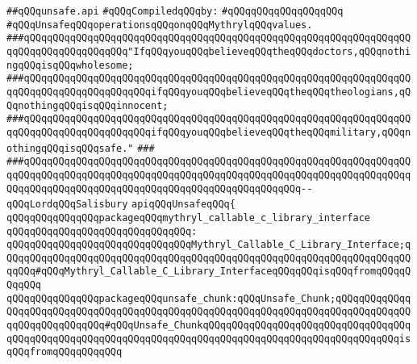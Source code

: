 \label{src/lib/std/src/unsafe/unsafe.api}
\verb|##qQQqunsafe.api|\newline
\newline
\verb|#qQQqCompiledqQQqby:|\newline
\verb|#qQQqqQQqqQQqqQQqqQQq|\newline
\newline
\newline
\newline
\verb|#qQQqUnsafeqQQqoperationsqQQqonqQQqMythrylqQQqvalues.|\newline
\newline
\newline
\verb|###qQQqqQQqqQQqqQQqqQQqqQQqqQQqqQQqqQQqqQQqqQQqqQQqqQQqqQQqqQQqqQQqqQQqqQQqqQQqqQQqqQQqqQQq"IfqQQqyouqQQqbelieveqQQqtheqQQqdoctors,qQQqnothingqQQqisqQQqwholesome;|\newline
\verb|###qQQqqQQqqQQqqQQqqQQqqQQqqQQqqQQqqQQqqQQqqQQqqQQqqQQqqQQqqQQqqQQqqQQqqQQqqQQqqQQqqQQqqQQqqQQqifqQQqyouqQQqbelieveqQQqtheqQQqtheologians,qQQqnothingqQQqisqQQqinnocent;|\newline
\verb|###qQQqqQQqqQQqqQQqqQQqqQQqqQQqqQQqqQQqqQQqqQQqqQQqqQQqqQQqqQQqqQQqqQQqqQQqqQQqqQQqqQQqqQQqqQQqifqQQqyouqQQqbelieveqQQqtheqQQqmilitary,qQQqnothingqQQqisqQQqsafe."|\newline
\verb|###|\newline
\verb|###qQQqqQQqqQQqqQQqqQQqqQQqqQQqqQQqqQQqqQQqqQQqqQQqqQQqqQQqqQQqqQQqqQQqqQQqqQQqqQQqqQQqqQQqqQQqqQQqqQQqqQQqqQQqqQQqqQQqqQQqqQQqqQQqqQQqqQQqqQQqqQQqqQQqqQQqqQQqqQQqqQQqqQQqqQQqqQQqqQQqqQQqqQQq--qQQqLordqQQqSalisbury|\newline
\newline
\verb|apiqQQqUnsafeqQQq{|\newline
\newline
\verb|qQQqqQQqqQQqqQQqpackageqQQqmythryl_callable_c_library_interface|\newline
\verb|qQQqqQQqqQQqqQQqqQQqqQQqqQQqqQQq:|\newline
\verb|qQQqqQQqqQQqqQQqqQQqqQQqqQQqqQQqMythryl_Callable_C_Library_Interface;qQQqqQQqqQQqqQQqqQQqqQQqqQQqqQQqqQQqqQQqqQQqqQQqqQQqqQQqqQQqqQQqqQQqqQQqqQQq#qQQqMythryl_Callable_C_Library_InterfaceqQQqqQQqisqQQqfromqQQqqQQqqQQq|\newline
\newline
\verb|qQQqqQQqqQQqqQQqpackageqQQqunsafe_chunk:qQQqUnsafe_Chunk;qQQqqQQqqQQqqQQqqQQqqQQqqQQqqQQqqQQqqQQqqQQqqQQqqQQqqQQqqQQqqQQqqQQqqQQqqQQqqQQqqQQqqQQqqQQqqQQqqQQq#qQQqUnsafe_ChunkqQQqqQQqqQQqqQQqqQQqqQQqqQQqqQQqqQQqqQQqqQQqqQQqqQQqqQQqqQQqqQQqqQQqqQQqqQQqqQQqqQQqqQQqqQQqqQQqqQQqqQQqisqQQqfromqQQqqQQqqQQq|\newline
